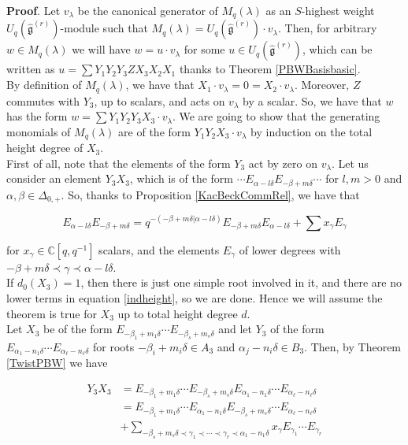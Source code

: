 \documentclass[12pt]{amsart}
\numberwithin{equation}{section}
\newcommand{\dem }{\noindent\textbf{Proof}. }
\newcommand{\C}{\ensuremath{\mathbb{C}}}
\newcommand{\g}{\ensuremath{\mathfrak{g}}}
\begin{document}
\dem Let $v_{\lambda}$ be the canonical generator of $M_q(\lambda)$ as an $S$-highest weight $U_q(\hat{\g}^{(r)})$-module such that $M_q(\lambda) = U_q(\hat{\g}^{(r)})\cdot v_{\lambda}$. Then, for arbitrary $w \in M_q(\lambda)$ we will have $w = u\cdot v_{\lambda}$ for some $u\in U_q(\hat{\g}^{(r)})$, which can be written as $u = \sum Y_1Y_2Y_3ZX_3X_2X_1$ thanks to Theorem \ref{PBWBasisbasic}.\\

By definition of $M_q(\lambda)$, we have that $X_1\cdot v_\lambda = 0 = X_2\cdot v_\lambda$. Moreover, $Z$ commutes with $Y_3$, up to scalars, and acts on $v_{\lambda}$ by a scalar. So, we have that $w$ has the form $w = \sum Y_1Y_2Y_3X_3 \cdot v_\lambda$. We are going to show that the generating monomials of $M_q(\lambda)$ are of the form $Y_1Y_2X_3\cdot v_{\lambda}$ by induction on the total height degree of $X_3$.\\

First of all, note that the elements of the form $Y_3$ act by zero on $v_\lambda$. Let us consider an element $Y_3X_3$, which is of the form $\cdots E_{\alpha-l\delta}E_{-\beta + m\delta}\cdots$ for $l,m >0$ and $\alpha, \beta \in \Delta_{0,+}$. So, thanks to Proposition \ref{KacBeckCommRel}, we have that 

\begin{equation}\label{indheight}
    E_{\alpha-l\delta}E_{-\beta + m\delta} = q^{-(-\beta + m\delta | \alpha-l\delta)} E_{-\beta + m\delta}E_{\alpha-l\delta} + \sum x_{\gamma}E_{\gamma}
\end{equation}

for $x_\gamma\in \C[q,q^{-1}]$ scalars, and the elements $E_{\gamma}$ of lower degrees with $-\beta + m\delta \prec \gamma \prec \alpha -l\delta$.\\

If $d_0(X_3)=1$, then there is just one simple root involved in it, and there are no lower terms in equation \ref{indheight}, so we are done. Hence we will assume the theorem is true for $X_3$ up to total height degree $d$.\\

Let $X_3$ be of the form $E_{-\beta_1+m_1\delta} \cdots E_{-\beta_s + m_s\delta}$ and let $Y_3$ of the form $E_{\alpha_1-n_1\delta} \cdots E_{\alpha_\ell - n_\ell\delta}$ for roots $-\beta_i + m_i\delta \in A_3$ and $\alpha_j - n_i\delta \in B_3$. Then, by Theorem \ref{TwistPBW} we have 

\begin{align*}
    Y_3X_3 &= E_{-\beta_1+m_1\delta} \cdots E_{-\beta_s + m_s\delta}E_{\alpha_1-n_1\delta} \cdots E_{\alpha_\ell - n_\ell\delta} \\
    &= E_{-\beta_1+m_1\delta} \cdots E_{\alpha_1-n_1\delta}E_{-\beta_s + m_s\delta} \cdots E_{\alpha_\ell - n_\ell\delta} \\
    &+ \sum_{-\beta_s + m_s\delta \prec \gamma_1 \prec \cdots \prec \gamma_r \prec \alpha_1-n_1\delta} x_\gamma E_{\gamma_1} \cdots E_{\gamma_r}
\end{align*}
\end{document}
